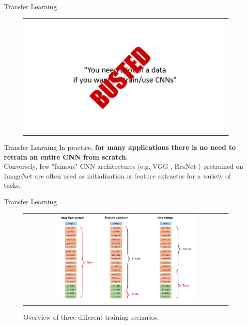 \documentclass[aspectratio=169]{beamer}
\begin{document}
\begin{frame}{Transfer Learning}
\vspace{-1cm}
\begin{figure}
\begin{tabular}{c}
\includegraphics[width=\textwidth]{img/cnn/busted_1.pdf}
\end{tabular}
\end{figure}
\end{frame}


\begin{frame}{Transfer Learning}
In practice, \textbf{for many applications there is no need to retrain an entire CNN from scratch}.\\
\vspace{0.5cm}
Conversely, few "famous" CNN architectures (e.g. VGG \cite{simonyan2014very}, ResNet \cite{he2016deep}) pretrained on ImageNet \cite{deng2009imagenet} are often used as initialization or feature extractor for a variety of tasks.
\end{frame}


\begin{frame}{Transfer Learning}
\begin{figure}
\begin{tabular}{c}
\includegraphics[width=0.7\textwidth]{img/cnn/training_possibilities.png}
\end{tabular}
\caption{Overview of three different training scenarios.}
\end{figure}
\end{frame}
\end{document}
